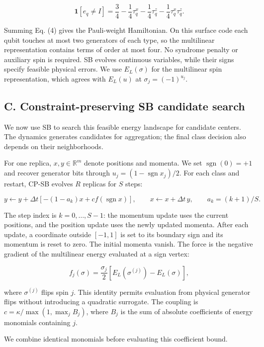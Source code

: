 \documentclass[
  10pt,
]{article}
\begin{document}
\[
\mathbf1[e_q\ne I]
=\frac34-\frac14\tau_q^x-\frac14\tau_q^z
-\frac14\tau_q^x\tau_q^z.
\tag{4}\label{eq:4}
\]

Summing Eq. (4) gives the Pauli-weight Hamiltonian. On this surface code
each qubit touches at most two generators of each type, so the
multilinear representation contains terms of order at most four. No
syndrome penalty or auxiliary spin is required. SB evolves continuous
variables, while their signs specify feasible physical errors. We use
\(E_L(\sigma)\) for the multilinear spin representation, which agrees
with \(E_L(u)\) at \(\sigma_j=(-1)^{u_j}\).

\subsection{C. Constraint-preserving SB candidate
search}\label{c.-constraint-preserving-sb-candidate-search}

We now use SB to search this feasible energy landscape for candidate
centers. The dynamics generates candidates for aggregation; the final
class decision also depends on their neighborhoods.

For one replica, \(x,y\in\mathbb R^m\) denote positions and momenta. We
set \(\operatorname{sgn}(0)=+1\) and recover generator bits through
\(u_j=(1-\operatorname{sgn}x_j)/2\). For each class and restart, CP-SB
evolves \(R\) replicas for \(S\) steps:

\[
y\leftarrow y+\Delta t[-(1-a_k)x+c f(\operatorname{sgn}x)],
\qquad x\leftarrow x+\Delta t\,y,
\qquad a_k=(k+1)/S.
\tag{5}\label{eq:5}
\]

The step index is \(k=0,\ldots,S-1\): the momentum update uses the
current positions, and the position update uses the newly updated
momenta. After each update, a coordinate outside \([-1,1]\) is set to
its boundary sign and its momentum is reset to zero. The initial momenta
vanish. The force is the negative gradient of the multilinear energy
evaluated at a sign vertex:

\[
f_j(\sigma)=\frac{\sigma_j}{2}
\left[E_L(\sigma^{(j)})-E_L(\sigma)\right],
\tag{6}\label{eq:6}
\]

where \(\sigma^{(j)}\) flips spin \(j\). This identity permits
evaluation from physical generator flips without introducing a quadratic
surrogate. The coupling is \(c=\kappa/\max(1,\max_j B_j)\), where
\(B_j\) is the sum of absolute coefficients of energy monomials
containing \(j\).

We combine identical monomials before evaluating this coefficient bound.
\end{document}
